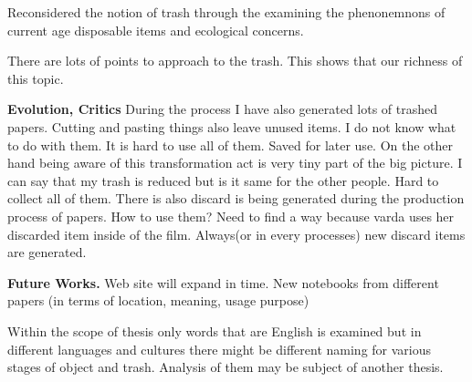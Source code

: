 Reconsidered the notion of trash through the examining the phenonemnons of current age disposable items and ecological concerns. 

There are lots of points to approach to the trash. This shows that our richness of this topic. 











%
%
\textbf{Evolution, Critics} During the process I have also generated lots of trashed papers. Cutting and pasting things also leave unused items. I do not know what to do with them. It is hard to use all of them. Saved for later use. On the other hand being aware of this transformation act is very tiny part of the big picture. I can say that my trash is reduced but is it same for the other people. Hard to collect all of them. 
There is also discard is being generated during the production process of papers. How to use them? Need to find a way because varda uses her discarded item inside of the film. Always(or in every processes) new discard items are generated.






%
%
\textbf{Future Works.} Web site will expand in time. New notebooks from different papers (in terms of location, meaning, usage purpose)

Within the scope of thesis only words that are English is examined but in different languages and cultures there might be different naming for various stages of object and trash. Analysis of them may be subject of another thesis.






